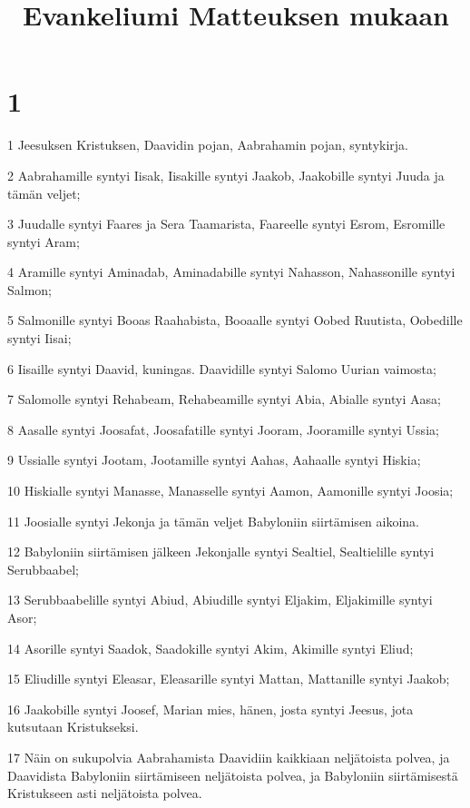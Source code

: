 

\title{Evankeliumi Matteuksen mukaan}


\chapter{1}

\par 1 Jeesuksen Kristuksen, Daavidin pojan, Aabrahamin pojan, syntykirja.
\par 2 Aabrahamille syntyi Iisak, Iisakille syntyi Jaakob, Jaakobille syntyi Juuda ja tämän veljet;
\par 3 Juudalle syntyi Faares ja Sera Taamarista, Faareelle syntyi Esrom, Esromille syntyi Aram;
\par 4 Aramille syntyi Aminadab, Aminadabille syntyi Nahasson, Nahassonille syntyi Salmon;
\par 5 Salmonille syntyi Booas Raahabista, Booaalle syntyi Oobed Ruutista, Oobedille syntyi Iisai;
\par 6 Iisaille syntyi Daavid, kuningas. Daavidille syntyi Salomo Uurian vaimosta;
\par 7 Salomolle syntyi Rehabeam, Rehabeamille syntyi Abia, Abialle syntyi Aasa;
\par 8 Aasalle syntyi Joosafat, Joosafatille syntyi Jooram, Jooramille syntyi Ussia;
\par 9 Ussialle syntyi Jootam, Jootamille syntyi Aahas, Aahaalle syntyi Hiskia;
\par 10 Hiskialle syntyi Manasse, Manasselle syntyi Aamon, Aamonille syntyi Joosia;
\par 11 Joosialle syntyi Jekonja ja tämän veljet Babyloniin siirtämisen aikoina.
\par 12 Babyloniin siirtämisen jälkeen Jekonjalle syntyi Sealtiel, Sealtielille syntyi Serubbaabel;
\par 13 Serubbaabelille syntyi Abiud, Abiudille syntyi Eljakim, Eljakimille syntyi Asor;
\par 14 Asorille syntyi Saadok, Saadokille syntyi Akim, Akimille syntyi Eliud;
\par 15 Eliudille syntyi Eleasar, Eleasarille syntyi Mattan, Mattanille syntyi Jaakob;
\par 16 Jaakobille syntyi Joosef, Marian mies, hänen, josta syntyi Jeesus, jota kutsutaan Kristukseksi.
\par 17 Näin on sukupolvia Aabrahamista Daavidiin kaikkiaan neljätoista polvea, ja Daavidista Babyloniin siirtämiseen neljätoista polvea, ja Babyloniin siirtämisestä Kristukseen asti neljätoista polvea.

